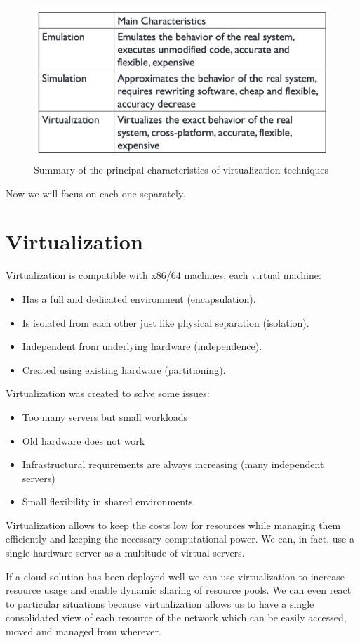 \begin{figure}
    \centering
    \includegraphics[scale=0.4]{img/summary_virtualization.png}
    \caption{Summary of the principal characteristics of virtualization techniques}
\end{figure}
Now we will focus on each one separately.
\section{Virtualization}
Virtualization is compatible with x86/64 machines, each virtual machine:
\begin{itemize}
    \item Has a full and dedicated environment (encapsulation).
    \item Is isolated from each other just like physical separation (isolation).
    \item Independent from underlying hardware (independence).
    \item Created using existing hardware (partitioning).
\end{itemize}
Virtualization was created to solve some issues:
\begin{itemize}
    \item Too many servers but small workloads
    \item Old hardware does not work
    \item Infrastructural requirements are always increasing (many independent servers)
    \item Small flexibility in shared environments
\end{itemize}
Virtualization allows to keep the costs low for resources while managing them efficiently and keeping the necessary computational power. We can, in fact, use a single hardware server as a multitude of virtual servers.

If a cloud solution has been deployed well we can use virtualization to increase resource usage and enable dynamic sharing of resource pools. We can even react to particular situations because virtualization allows us to have a single consolidated view of each resource of the network which can be easily accessed, moved and managed from wherever.

